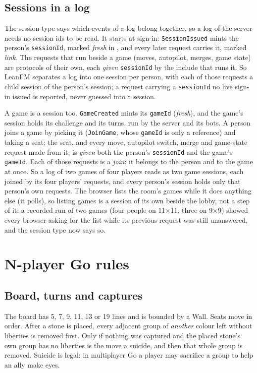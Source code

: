 \documentclass[11pt,oneside]{book}
\begin{document}
\section{Sessions in a log}
The session type says which events of a log belong together, so a log of the
server needs no session ids to be read. It starts at sign-in:
\texttt{SessionIssued} mints the person's \texttt{sessionId}, marked
\emph{fresh} in , and every later request carries
it, marked \emph{link}. The requests that run beside a game (moves, autopilot,
merges, game state) are protocols of their own, each \emph{given}
\texttt{sessionId} by the include that runs it. So LeanFM separates a log into one
session per person, with each of those requests a child session of the person's
session; a request carrying a \texttt{sessionId} no live sign-in issued is
reported, never guessed into a session.

A game is a session too. \texttt{GameCreated} mints its \texttt{gameId}
(\emph{fresh}), and the game's session holds its challenge and its turns, run by
the server and its bots. A person joins a game by picking it
(\texttt{JoinGame}, whose \texttt{gameId} is only a reference) and taking a
seat; the seat, and every move, autopilot switch, merge and game-state request
made from it, is \emph{given} both the person's \texttt{sessionId} and the
game's \texttt{gameId}. Each of those requests is a \emph{join}: it belongs to
the person and to the game at once. So a log of two games of four players reads
as two game sessions, each joined by its four players' requests, and every
person's session holds only that person's own requests.
The browser lists the room's games while it does anything else (it polls), so
listing games is a session of its own beside the lobby, not a step of it: a
recorded run of two games (four people on 11×11, three on 9×9) showed every
browser asking for the list while its previous request was still unanswered,
and the session type now says so.

\chapter{N-player Go rules}
\section{Board, turns and captures}
The board has 5, 7, 9, 11, 13 or 19 lines and is bounded by a Wall. Seats move
in order. After a stone is placed, every adjacent group of \emph{another}
colour left without liberties is removed first. Only if nothing was captured
and the placed stone's own group has no liberties is the move a suicide, and
then that whole group is removed. Suicide is legal: in multiplayer Go a player
may sacrifice a group to help an ally make eyes.
\end{document}
